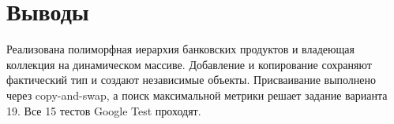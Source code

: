 \section{Выводы}
Реализована полиморфная иерархия банковских продуктов и владеющая коллекция на динамическом массиве. Добавление и копирование сохраняют фактический тип и создают независимые объекты. Присваивание выполнено через copy-and-swap, а поиск максимальной метрики решает задание варианта 19. Все 15 тестов Google Test проходят.
